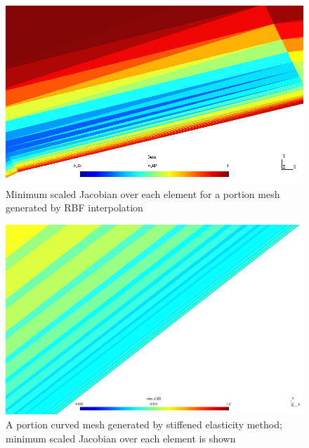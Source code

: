 \documentclass[t,12pt]{beamer}
\begin{document}
\begin{frame}
	\begin{figure}
		\centering
		\includegraphics[scale=0.3]{3comp-rbf-zoomed-jacobians2.png}
		\caption{Minimum scaled Jacobian over each element for a portion mesh generated by RBF interpolation}
		\label{fig:rbf-jacobians}
	\end{figure}
\end{frame}
\begin{frame}
\begin{figure}
	\centering
	\includegraphics[scale=0.2]{3comp_curved_elaststiff_vzoomed_jac}
	\caption{A portion curved mesh generated by stiffened elasticity method; minimum scaled Jacobian over each element is shown}
	\label{fig:3compstiffelastjac}
\end{figure}
\end{frame}
\end{document}
